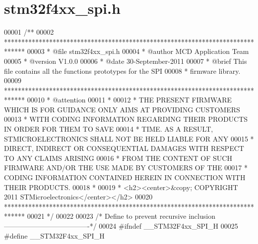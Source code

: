 \section{stm32f4xx\+\_\+spi.\+h}
\label{stm32f4xx__spi_8h_source}

\begin{DoxyCode}
00001 \textcolor{comment}{/**}
00002 \textcolor{comment}{  ******************************************************************************}
00003 \textcolor{comment}{  * @file    stm32f4xx\_spi.h}
00004 \textcolor{comment}{  * @author  MCD Application Team}
00005 \textcolor{comment}{  * @version V1.0.0}
00006 \textcolor{comment}{  * @date    30-September-2011}
00007 \textcolor{comment}{  * @brief   This file contains all the functions prototypes for the SPI }
00008 \textcolor{comment}{  *          firmware library.}
00009 \textcolor{comment}{  ******************************************************************************}
00010 \textcolor{comment}{  * @attention}
00011 \textcolor{comment}{  *}
00012 \textcolor{comment}{  * THE PRESENT FIRMWARE WHICH IS FOR GUIDANCE ONLY AIMS AT PROVIDING CUSTOMERS}
00013 \textcolor{comment}{  * WITH CODING INFORMATION REGARDING THEIR PRODUCTS IN ORDER FOR THEM TO SAVE}
00014 \textcolor{comment}{  * TIME. AS A RESULT, STMICROELECTRONICS SHALL NOT BE HELD LIABLE FOR ANY}
00015 \textcolor{comment}{  * DIRECT, INDIRECT OR CONSEQUENTIAL DAMAGES WITH RESPECT TO ANY CLAIMS ARISING}
00016 \textcolor{comment}{  * FROM THE CONTENT OF SUCH FIRMWARE AND/OR THE USE MADE BY CUSTOMERS OF THE}
00017 \textcolor{comment}{  * CODING INFORMATION CONTAINED HEREIN IN CONNECTION WITH THEIR PRODUCTS.}
00018 \textcolor{comment}{  *}
00019 \textcolor{comment}{  * <h2><center>&copy; COPYRIGHT 2011 STMicroelectronics</center></h2>}
00020 \textcolor{comment}{  ******************************************************************************  }
00021 \textcolor{comment}{  */}
00022 
00023 \textcolor{comment}{/* Define to prevent recursive inclusion -------------------------------------*/}
00024 \textcolor{preprocessor}{#}\textcolor{preprocessor}{ifndef} \textcolor{preprocessor}{\_\_STM32F4xx\_SPI\_H}
00025 \textcolor{preprocessor}{#}\textcolor{preprocessor}{define} \textcolor{preprocessor}{\_\_STM32F4xx\_SPI\_H}

\end{DoxyCode}
